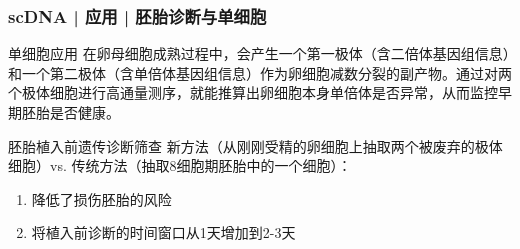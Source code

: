 \documentclass[11pt]{ctexbeamer}
\begin{document}
\begin{frame}
  \frametitle{scDNA | 应用 | 胚胎诊断与单细胞}
  \begin{block}{单细胞应用}
在卵母细胞成熟过程中，会产生一个第一极体（含二倍体基因组信息）和一个第二极体（含单倍体基因组信息）作为卵细胞减数分裂的副产物。通过对两个极体细胞进行高通量测序，就能推算出卵细胞本身单倍体是否异常，从而监控早期胚胎是否健康。
  \end{block}
  \begin{block}{胚胎植入前遗传诊断筛查}
      新方法（从刚刚受精的卵细胞上抽取两个被废弃的极体细胞）vs. 传统方法（抽取8细胞期胚胎中的一个细胞）：
        \begin{enumerate}
          \item 降低了损伤胚胎的风险
          \item 将植入前诊断的时间窗口从1天增加到2-3天
        \end{enumerate}
  \end{block}
\end{frame}
\end{document}
